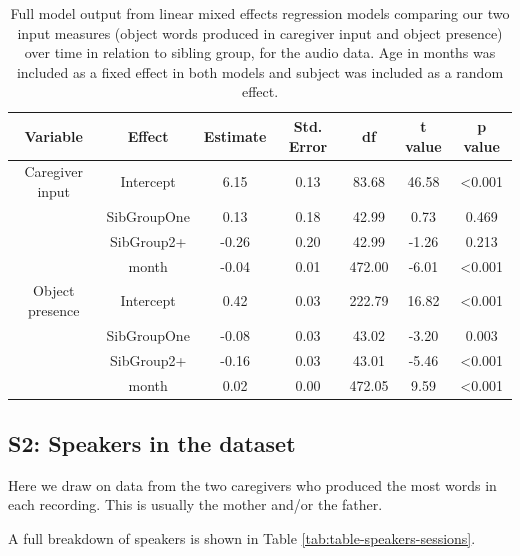 \documentclass[
  man,floatsintext]{apa6}
\begin{document}
\begin{longtable}[t]{ccccccc}
\caption{\label{tab:table-input-model-summary-audio}Full model output from linear mixed effects regression models comparing our two input measures (object words produced in caregiver input and object presence) over time in relation to sibling group, for the audio data. Age in months was included as a fixed effect in both models and subject was included as a random effect.}\\
\toprule
Variable & Effect & Estimate & Std. Error & df & t value & p value\\
\midrule
Caregiver input & Intercept & 6.15 & 0.13 & 83.68 & 46.58 & <0.001\\
 & SibGroupOne & 0.13 & 0.18 & 42.99 & 0.73 & 0.469\\
 & SibGroup2+ & -0.26 & 0.20 & 42.99 & -1.26 & 0.213\\
 & month & -0.04 & 0.01 & 472.00 & -6.01 & <0.001\\
\midrule
Object presence & Intercept & 0.42 & 0.03 & 222.79 & 16.82 & <0.001\\
\addlinespace
 & SibGroupOne & -0.08 & 0.03 & 43.02 & -3.20 & 0.003\\
 & SibGroup2+ & -0.16 & 0.03 & 43.01 & -5.46 & <0.001\\
 & month & 0.02 & 0.00 & 472.05 & 9.59 & <0.001\\
\bottomrule
\end{longtable}

\newpage

\hypertarget{s2-speakers-in-the-dataset}{%
\subsection{S2: Speakers in the dataset}\label{s2-speakers-in-the-dataset}}

Here we draw on data from the two caregivers who produced the most words in each recording. This is usually the mother and/or the father.

A full breakdown of speakers is shown in Table \ref{tab:table-speakers-sessions}.
\end{document}
